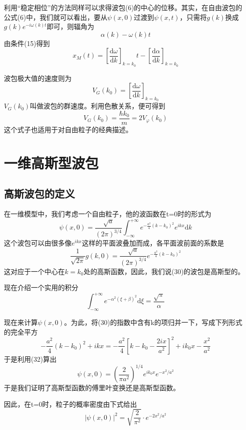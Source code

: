\documentclass[]{article}
\begin{document}
利用“稳定相位”的方法同样可以求得波包(6)的中心的位移。其实，在自由波包的公式(6)中，我们就可以看出，要从$\psi(x,0)$过渡到$\psi(x,t)$，只需将$g(k)$换成$g(k)e^{-i\omega(k)t}$即可，则辐角为
\begin{equation}
	\alpha(k)-\omega(k)t
\end{equation}
由条件(15)得到
\begin{equation}
	x_M(t)=\left[ \dfrac{\mathrm{d}\omega}{\mathrm{d}k}\right] _{k=k_0}t-\left[ \dfrac{\mathrm{d}\alpha}{\mathrm{d}k}\right] _{k=k_0}
\end{equation}

波包极大值的速度则为
\begin{equation}
	V_G(k_0)=\left[ \dfrac{\mathrm{d}\omega}{\mathrm{d}k}\right] _{k=k_0}
\end{equation}
$V_G(k_0)$叫做波包的群速度。利用色散关系，便可得到
\begin{equation}
	V_G(k_0)=\dfrac{\hbar k_0}{m}=2V_{\varphi}(k_0)
\end{equation}
这个式子也适用于对自由粒子的经典描述。
\section{一维高斯型波包}
\subsection{高斯波包的定义}
在一维模型中，我们考虑一个自由粒子，他的波函数在t=0时的形式为
\begin{equation}
	\psi(x,0)=\dfrac{\sqrt{a}}{(2\pi)^{3/4}}\int^{+\infty}_{-\infty}e^{-\frac{a^2}{4}(k-k_0)^2}e^{ikx}\mathrm{d}k
\end{equation}
这个波包可以由很多像$e^{ikx}$这样的平面波叠加而成，各平面波前面的系数是
\begin{equation}
	\dfrac{1}{\sqrt{2\pi}}g(k,0)=\dfrac{\sqrt{a}}{(2\pi)^{3/4}}e^{-\frac{a^2}{4}(k-k_0)^2}
\end{equation}
这对应于一个中心在$k=k_0$处的高斯函数，因此，我们说(30)的波包是高斯型的。\par 
现在介绍一个实用的积分
\begin{equation}
	\int^{+\infty}_{-\infty}e^{-\alpha^2(\xi+\beta)^2}\mathrm{d}\xi=\dfrac{\sqrt{\pi}}{\alpha}
\end{equation}

现在来计算$\psi(x,0)$。为此，将(30)的指数中含有k的项归并一下，写成下列形式的完全平方
\begin{equation}
	-\dfrac{a^2}{4}(k-k_0)^2+ikx=-\dfrac{a^2}{4}\left[ k-k_0-\dfrac{2ix}{a^2}\right] ^2+ik_0x-\dfrac{x^2}{a^2}
\end{equation}
于是利用(32)算出
\begin{equation}
	\psi(x,0)=\left( \dfrac{2}{\pi a^2}\right) ^{1/4}e^{ik_0x}e^{-x^2/a^2}
\end{equation}
于是我们证明了高斯型函数的傅里叶变换还是高斯型函数。\par
因此，在t=0时，粒子的概率密度由下式给出
\begin{equation}
	|\psi(x,0)|^2=\sqrt{\dfrac{2}{\pi ^2}}\cdot e^{-2x^2/a^2}
\end{equation}
\end{document}
